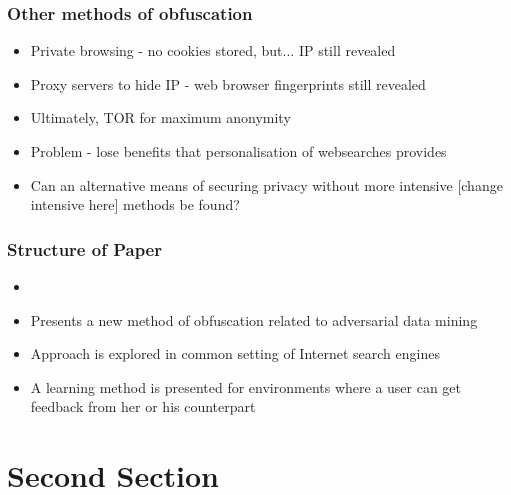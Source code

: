 \documentclass{beamer}
\begin{document}

\begin{frame}
\frametitle{Other methods of obfuscation}
\begin{itemize}
	\item Private browsing - no cookies stored, but... IP still revealed
	\item Proxy servers to hide IP - web browser fingerprints still revealed
	\item Ultimately, TOR for maximum anonymity
	\item Problem - lose benefits that personalisation of websearches provides
	\item Can an alternative means of securing privacy without more intensive [change intensive here] methods be found?
\end{itemize}
\end{frame}

\begin{frame}
\frametitle{Structure of Paper}
\begin{itemize} %
	\item 
	\item Presents a new method of obfuscation related to adversarial data mining
	\item Approach is explored in common setting of Internet search engines
	\item A learning method is presented for environments where a user can get feedback from her or his counterpart
\end{itemize}
\end{frame}

\section{Second Section}

\begin{frame}

\end{frame}


\begin{frame}

\end{frame}

\end{document}
